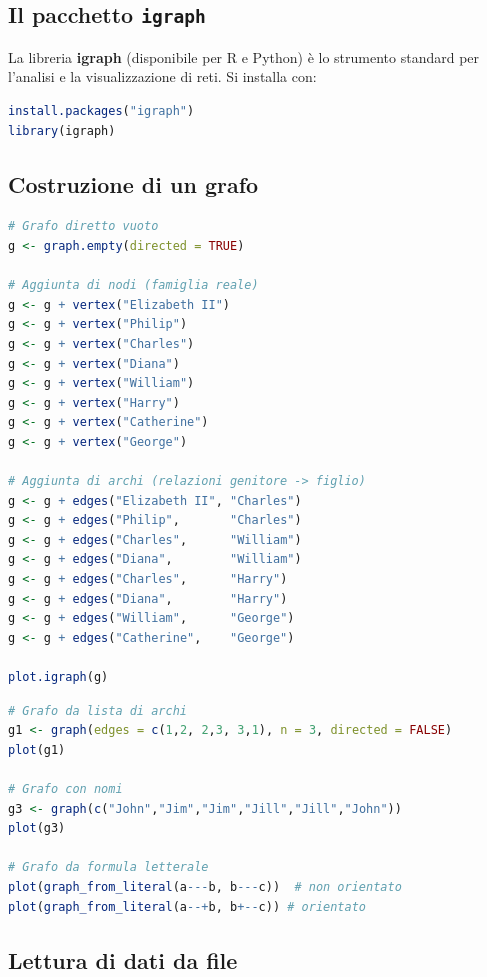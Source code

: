 \documentclass[12pt,a4paper]{article}
\begin{document}
\subsection{Il pacchetto \texttt{igraph}}

La libreria \textbf{igraph} (disponibile per R e Python) è lo strumento standard per l'analisi
e la visualizzazione di reti. Si installa con:

\begin{lstlisting}[language=R]
install.packages("igraph")
library(igraph)
\end{lstlisting}

\subsection{Costruzione di un grafo}

\begin{lstlisting}[language=R]
# Grafo diretto vuoto
g <- graph.empty(directed = TRUE)

# Aggiunta di nodi (famiglia reale)
g <- g + vertex("Elizabeth II")
g <- g + vertex("Philip")
g <- g + vertex("Charles")
g <- g + vertex("Diana")
g <- g + vertex("William")
g <- g + vertex("Harry")
g <- g + vertex("Catherine")
g <- g + vertex("George")

# Aggiunta di archi (relazioni genitore -> figlio)
g <- g + edges("Elizabeth II", "Charles")
g <- g + edges("Philip",       "Charles")
g <- g + edges("Charles",      "William")
g <- g + edges("Diana",        "William")
g <- g + edges("Charles",      "Harry")
g <- g + edges("Diana",        "Harry")
g <- g + edges("William",      "George")
g <- g + edges("Catherine",    "George")

plot.igraph(g)
\end{lstlisting}

\begin{lstlisting}[language=R]
# Grafo da lista di archi
g1 <- graph(edges = c(1,2, 2,3, 3,1), n = 3, directed = FALSE)
plot(g1)

# Grafo con nomi
g3 <- graph(c("John","Jim","Jim","Jill","Jill","John"))
plot(g3)

# Grafo da formula letterale
plot(graph_from_literal(a---b, b---c))  # non orientato
plot(graph_from_literal(a--+b, b+--c)) # orientato
\end{lstlisting}

\subsection{Lettura di dati da file}
\end{document}
